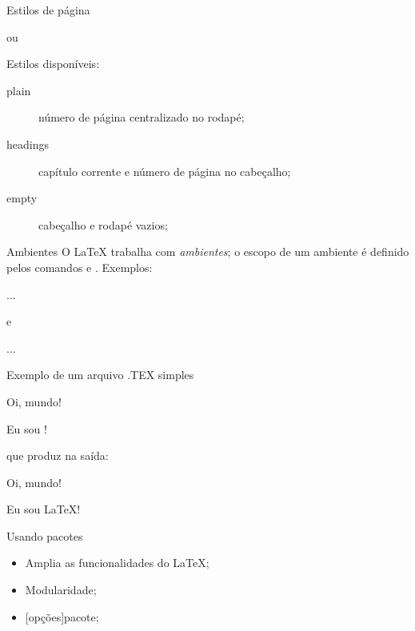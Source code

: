 \begin{frame}{Estilos de página}
\begin{LaTeXcode}
\n
ou\n
{}
\end{LaTeXcode}

Estilos disponíveis:

\begin{description}
\item [plain] número de página centralizado no rodapé;
\item [headings] capítulo corrente e número de página no cabeçalho;
\item [empty] cabeçalho e rodapé vazios;
\end{description}
\end{frame}

\begin{frame}{Ambientes}
O \LaTeX{} trabalha com \emph{ambientes}; o escopo de um ambiente é
definido pelos comandos  e
. Exemplos:

\begin{LaTeXcode}
...
\end{LaTeXcode}
e
\begin{LaTeXcode}
...
\end{LaTeXcode}
\end{frame}

\begin{frame}{Exemplo de um arquivo .TEX simples}
\begin{LaTeXcode}
\n
{}\n
Oi, mundo!\n

Eu sou !\n
{}
\end{LaTeXcode}
que produz na saída:

\begin{LaTeXoutput}
Oi, mundo!

Eu sou \LaTeX!
\end{LaTeXoutput}
\end{frame}

\begin{frame}{Usando pacotes}

\begin{itemize}
\item Amplia as funcionalidades do \LaTeX;
\item Modularidade;
\item {}[opções]{pacote};
\end{itemize}
\end{frame}

